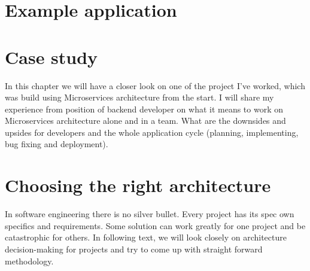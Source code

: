 




\chapter{Example application}


\chapter{Case study}
\label{chapter:personal_experience}
In this chapter we will have a closer look on one of the project I've worked, which was build using Microservices architecture from the start. I will share my experience from position of backend developer on what it means to work on Microservices architecture alone and in a team. What are the downsides and upsides for developers and the whole application cycle (planning, implementing, bug fixing and deployment).



\chapter{Choosing the right architecture}
In software engineering there is no silver bullet. Every project has its spec own specifics and requirements. Some solution can work greatly for one project and be catastrophic for others. In following text, we will look closely on architecture decision-making for projects and try to come up with straight forward methodology.

